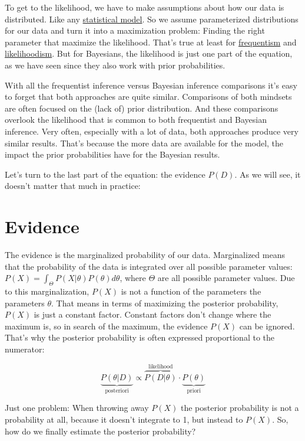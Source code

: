 \documentclass[
  10pt,
]{scrbook}
\begin{document}
To get to the likelihood, we have to make assumptions about how our data is distributed.
Like any \protect\hyperlink{statistical-modeling}{statistical model}.
So we assume parameterized distributions for our data and turn it into a maximization problem: Finding the right parameter that maximize the likelihood.
That's true at least for \protect\hyperlink{frequentism}{frequentism} and \protect\hyperlink{likelihoodism}{likelihoodism}.
But for Bayesians, the likelihood is just one part of the equation, as we have seen since they also work with prior probabilities.

With all the frequentist inference versus Bayesian inference comparisons it's easy to forget that both approaches are quite similar.
Comparisons of both mindsets are often focused on the (lack of) prior distribution.
And these comparisons overlook the likelihood that is common to both frequentist and Bayesian inference.
Very often, especially with a lot of data, both approaches produce very similar results.
That's because the more data are available for the model, the impact the prior probabilities have for the Bayesian results.

Let's turn to the last part of the equation: the evidence \(P(D)\).
As we will see, it doesn't matter that much in practice:

\hypertarget{evidence}{%
\section{Evidence}\label{evidence}}

The evidence is the marginalized probability of our data.
Marginalized means that the probability of the data is integrated over all possible parameter values: \(P(X) = \int_{\Theta} P(X|\theta) P(\theta) d\theta\), where \(\Theta\) are all possible parameter values.
Due to this marginalization, \(P(X)\) is not a function of the parameters the parameters \(\theta\).
That means in terms of maximizing the posterior probability, \(P(X)\) is just a constant factor.
Constant factors don't change where the maximum is, so in search of the maximum, the evidence \(P(X)\) can be ignored.
That's why the posterior probability is often expressed proportional to the numerator:

\[\underbrace{P(\theta|D)}_{\text{posteriori}} \propto \overbrace{P(D | \theta)}^{\text{likelihood}} \cdot  \underbrace{P(\theta)}_{\text{priori}}\]

Just one problem: When throwing away \(P(X)\) the posterior probability is not a probability at all, because it doesn't integrate to 1, but instead to \(P(X)\).
So, how do we finally estimate the posterior probability?
\end{document}
